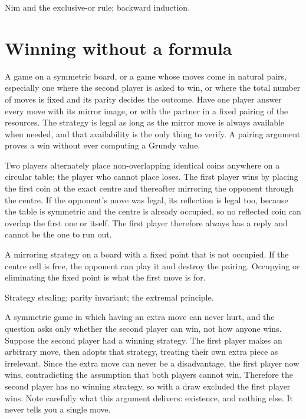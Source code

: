 \begin{seealsob}Nim and the exclusive-or rule; backward induction.\end{seealsob}

\section{Winning without a formula}

\cue A game on a symmetric board, or a game whose moves come in natural pairs, especially one where the second player is asked to win, or where the total number of moves is fixed and its parity decides the outcome.
\method Have one player answer every move with its mirror image, or with the partner in a fixed pairing of the resources. The strategy is legal as long as the mirror move is always available when needed, and that availability is the only thing to verify. A pairing argument proves a win without ever computing a Grundy value.

\begin{worked}
Two players alternately place non-overlapping identical coins anywhere on a circular table; the player who cannot place loses. The first player wins by placing the first coin at the exact centre and thereafter mirroring the opponent through the centre. If the opponent's move was legal, its reflection is legal too, because the table is symmetric and the centre is already occupied, so no reflected coin can overlap the first one or itself. The first player therefore always has a reply and cannot be the one to run out.
\end{worked}

\begin{trap}
A mirroring strategy on a board with a fixed point that is not occupied. If the centre cell is free, the opponent can play it and destroy the pairing. Occupying or eliminating the fixed point is what the first move is for.
\end{trap}

\begin{seealsob}Strategy stealing; parity invariant; the extremal principle.\end{seealsob}

\cue A symmetric game in which having an extra move can never hurt, and the question asks only whether the second player can win, not how anyone wins.
\method Suppose the second player had a winning strategy. The first player makes an arbitrary move, then adopts that strategy, treating their own extra piece as irrelevant. Since the extra move can never be a disadvantage, the first player now wins, contradicting the assumption that both players cannot win. Therefore the second player has no winning strategy, so with a draw excluded the first player wins. Note carefully what this argument delivers: existence, and nothing else. It never tells you a single move.

